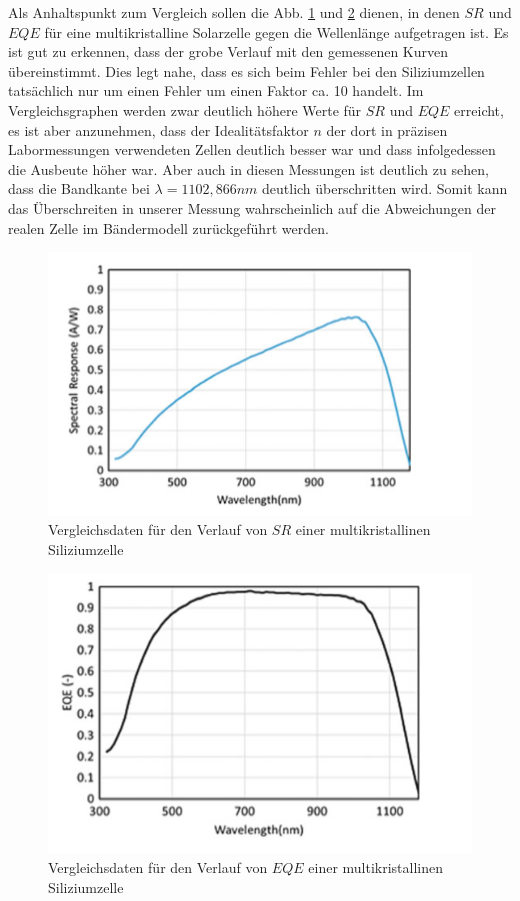 Als Anhaltspunkt zum Vergleich sollen die Abb. \ref{bild:ThSR} und \ref{bild:ThEQE} dienen, in denen $SR$ und $EQE$ für eine multikristalline Solarzelle 
gegen die Wellenlänge aufgetragen ist. Es ist gut zu erkennen, dass der grobe Verlauf mit den gemessenen Kurven übereinstimmt. Dies
legt nahe, dass es sich beim Fehler bei den Siliziumzellen tatsächlich nur um einen Fehler um einen Faktor ca. 10 handelt. Im 
Vergleichsgraphen werden zwar deutlich höhere Werte für $SR$ und $EQE$ erreicht, es ist aber anzunehmen, dass der Idealitätsfaktor $n$ 
der dort in präzisen Labormessungen verwendeten Zellen deutlich besser war und dass infolgedessen die Ausbeute höher war.
Aber auch in diesen Messungen ist deutlich zu sehen, dass die Bandkante bei $\lambda = 1102,866 nm$ deutlich überschritten wird. Somit
kann das Überschreiten in unserer Messung wahrscheinlich auf die Abweichungen der realen Zelle im Bändermodell zurückgeführt werden.

\begin{figure}[h]
    \centering
    \includegraphics[scale=0.75]{Bilder/Theorie_SR.png}
    \caption{Vergleichsdaten für den Verlauf von $SR$ einer multikristallinen Siliziumzelle}
    \label{bild:ThSR}
\end{figure}

\begin{figure}[h]
    \centering
    \includegraphics[scale=0.75]{Bilder/Theorie_EQE.png}
    \caption{Vergleichsdaten für den Verlauf von $EQE$ einer multikristallinen Siliziumzelle}
    \label{bild:ThEQE}
\end{figure}


